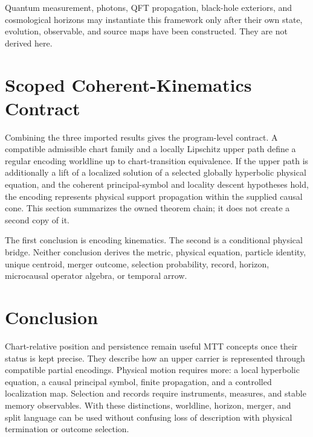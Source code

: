 \documentclass[11pt]{article}
\begin{document}
Quantum measurement, photons, QFT propagation, black-hole exteriors, and
cosmological horizons may instantiate this framework only after their own
state, evolution, observable, and source maps have been constructed. They are
not derived here.

\section{Scoped Coherent-Kinematics Contract}

Combining the three imported results gives the program-level contract.  A
compatible admissible chart family and a locally Lipschitz upper path define
a regular encoding worldline up to chart-transition equivalence.  If the
upper path is additionally a lift of a localized solution of a selected
globally hyperbolic physical equation, and the coherent principal-symbol and
locality descent hypotheses hold, the encoding represents physical support
propagation within the supplied causal cone.  This section summarizes the
owned theorem chain; it does not create a second copy of it.

The first conclusion is encoding kinematics. The second is a conditional
physical bridge. Neither conclusion derives the metric, physical equation,
particle identity, unique centroid, merger outcome, selection probability,
record, horizon, microcausal operator algebra, or temporal arrow.

\section{Conclusion}

Chart-relative position and persistence remain useful MTT concepts once their
status is kept precise. They describe how an upper carrier is represented
through compatible partial encodings. Physical motion requires more: a local
hyperbolic equation, a causal principal symbol, finite propagation, and a
controlled localization map. Selection and records require instruments,
measures, and stable memory observables. With these distinctions, worldline,
horizon, merger, and split language can be used without confusing loss of
description with physical termination or outcome selection.
\end{document}
